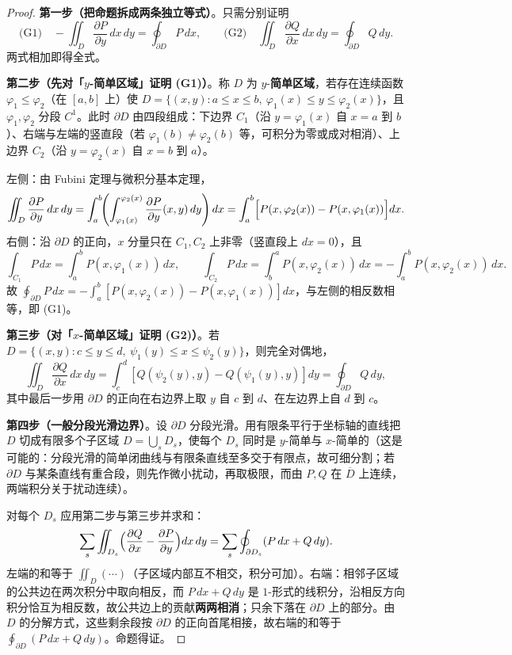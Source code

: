 \begin{proof}
\textbf{第一步（把命题拆成两条独立等式）}。只需分别证明
\[
\text{(G1)}\quad -\iint_D \frac{\partial P}{\partial y}\,dx\,dy = \oint_{\partial D}P\,dx,
\qquad
\text{(G2)}\quad \iint_D \frac{\partial Q}{\partial x}\,dx\,dy = \oint_{\partial D}Q\,dy .
\]
两式相加即得全式。

\textbf{第二步（先对「$y$-简单区域」证明 (G1)）}。称 $D$ 为 $y$-\textbf{简单区域}，若存在连续函数 $\varphi_1\le\varphi_2$（在 $[a,b]$ 上）使
$D = \{(x,y) : a\le x\le b,\ \varphi_1(x)\le y\le \varphi_2(x)\}$，且 $\varphi_1,\varphi_2$ 分段 $C^1$。此时 $\partial D$ 由四段组成：下边界 $C_1$（沿 $y=\varphi_1(x)$ 自 $x=a$ 到 $b$）、右端与左端的竖直段（若 $\varphi_1(b)\ne\varphi_2(b)$ 等，可积分为零或成对相消）、上边界 $C_2$（沿 $y=\varphi_2(x)$ 自 $x=b$ 到 $a$）。

左侧：由 Fubini 定理与微积分基本定理，
\[
\iint_D\frac{\partial P}{\partial y}\,dx\,dy
= \int_a^b\!\!\left(\int_{\varphi_1(x)}^{\varphi_2(x)}\frac{\partial P}{\partial y}(x,y)\,dy\right)dx
= \int_a^b\Bigl[P(x,\varphi_2(x))-P(x,\varphi_1(x))\Bigr]dx .
\]
右侧：沿 $\partial D$ 的正向，$x$ 分量只在 $C_1,C_2$ 上非零（竖直段上 $dx=0$），且
\[
\int_{C_1}P\,dx = \int_a^b P(x,\varphi_1(x))\,dx,
\qquad
\int_{C_2}P\,dx = \int_b^a P(x,\varphi_2(x))\,dx = -\int_a^bP(x,\varphi_2(x))\,dx .
\]
故 $\oint_{\partial D}P\,dx = -\int_a^b[P(x,\varphi_2(x))-P(x,\varphi_1(x))]dx$，与左侧的相反数相等，即 (G1)。

\textbf{第三步（对「$x$-简单区域」证明 (G2)）}。若 $D = \{(x,y):c\le y\le d,\ \psi_1(y)\le x\le\psi_2(y)\}$，则完全对偶地，
\[
\iint_D\frac{\partial Q}{\partial x}\,dx\,dy = \int_c^d[Q(\psi_2(y),y)-Q(\psi_1(y),y)]dy = \oint_{\partial D}Q\,dy,
\]
其中最后一步用 $\partial D$ 的正向在右边界上取 $y$ 自 $c$ 到 $d$、在左边界上自 $d$ 到 $c$。

\textbf{第四步（一般分段光滑边界）}。设 $\partial D$ 分段光滑。用有限条平行于坐标轴的直线把 $D$ 切成有限多个子区域 $D = \bigcup_{s}D_s$，使每个 $D_s$ 同时是 $y$-简单与 $x$-简单的（这是可能的：分段光滑的简单闭曲线与有限条直线至多交于有限点，故可细分割；若 $\partial D$ 与某条直线有重合段，则先作微小扰动，再取极限，而由 $P,Q$ 在 $\overline D$ 上连续，两端积分关于扰动连续）。

对每个 $D_s$ 应用第二步与第三步并求和：
\[
\sum_s\iint_{D_s}\Bigl(\frac{\partial Q}{\partial x}-\frac{\partial P}{\partial y}\Bigr)dx\,dy = \sum_s\oint_{\partial D_s}(P\,dx+Q\,dy).
\]
左端的和等于 $\iint_D(\cdots)$（子区域内部互不相交，积分可加）。右端：相邻子区域的公共边在两次积分中取向相反，而 $P\,dx+Q\,dy$ 是 $1$-形式的线积分，沿相反方向积分恰互为相反数，故公共边上的贡献\textbf{两两相消}；只余下落在 $\partial D$ 上的部分。由 $D$ 的分解方式，这些剩余段按 $\partial D$ 的正向首尾相接，故右端的和等于 $\oint_{\partial D}(P\,dx+Q\,dy)$。命题得证。
\end{proof}

